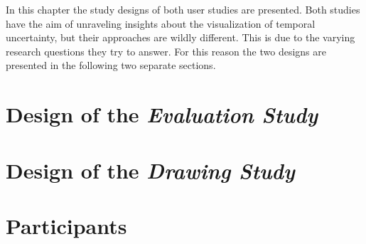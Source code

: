 In this chapter the study designs of both user studies are presented. Both studies have the aim of unraveling insights about the visualization of temporal uncertainty, but their approaches are wildly different. This is due to the varying research questions they try to answer. For this reason the two designs are presented in the following two separate sections. 

\section{Design of the \textit{Evaluation Study}}
\label{ch:evaluationMethod}



\section{Design of the \textit{Drawing Study}}
\label{ch:drawingMethod}


\section{Participants}
\label{ch:participants}
